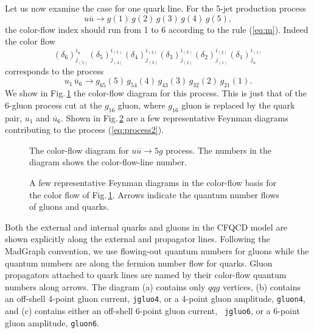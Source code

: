Let us now examine the case for one quark line. For the 5-jet production process
\begin{equation}
u\overline{u}\rightarrow g(1)\,g(2)\,g(3)\,g(4)\,g(5),
\label{eq:process1}
\end{equation}
the color-flow index should run from 1 to 6
according to the rule (\ref{eq:m}). Indeed the color flow
\begin{equation}
 (\delta_6)^{i_u}_{j_{(5)}}(\delta_5)^{i_{(5)}}_{j_{(4)}}
(\delta_4)^{i_{(4)}}_{j_{(3)}}
(\delta_3)^{i_{(3)}}_{j_{(2)}}(\delta_2)^{i_{(2)}}_{j_{(1)}}
(\delta_1)^{i_{(1)}}_{j_u}
\label{eq:deltas}
\end{equation}
corresponds to the process
 \begin{equation}
 u_1\,\overline{u}_6\rightarrow
g_{65}(5)\,g_{54}(4)\,g_{43}(3)\,g_{32}(2)\,g_{21}(1).
\label{eq:process2}
\end{equation}
We show in Fig.\,\ref{fig:cfdiagram} the color-flow diagram for this
process. This is just that of the 6-gluon process cut at the
$g_{16}$ gluon, where $g_{16}$ gluon is replaced by the quark pair, $u_1$
and $\overline{u}_6$. Shown in Fig.\,\ref{fig:repdiagrams} are a few representative Feynman
diagrams contributing to the process (\ref{eq:process2}).
\begin{figure}
\caption{The color-flow diagram for $u\overline{u}\rightarrow
 5g$ process. The numbers in the diagram shows the color-flow-line number.}
\label{fig:cfdiagram}
\end{figure}
\begin{figure}
\caption{A few representative Feynman diagrams in the color-flow basis
 for the color flow of Fig.\,\ref{fig:cfdiagram}. Arrows indicate the
 quantum number flows of gluons and quarks.}
\label{fig:repdiagrams}
\end{figure}
Both the external and internal quarks and gluons in the CFQCD model are
shown explicitly along the external and propagator lines. Following the
MadGraph convention, we use flowing-out quantum numbers for gluons while
the quantum numbers are along the fermion number flow for quarks. Gluon
propagators attached to quark lines are named by their color-flow
quantum numbers along arrows. The diagram (a) contains
only $qqg$ vertices, (b) contains an off-shell 4-point gluon current,
{\tt jgluo4}, or a 4-point gluon amplitude, {\tt gluon4}, and (c) contains either an off-shell 6-point gluon current, {\tt
jgluo6}, or a 6-point gluon amplitude, {\tt gluon6}.

